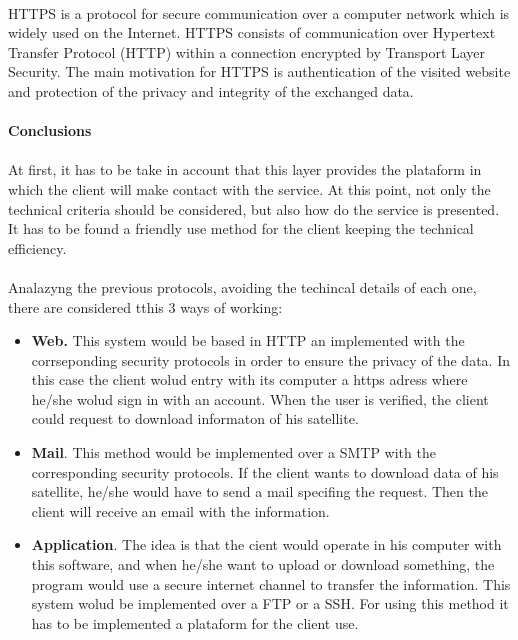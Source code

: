 \paragraph{}
HTTPS is a protocol for secure communication over a computer network which is widely used on the Internet. HTTPS consists of communication over Hypertext Transfer Protocol (HTTP) within a connection encrypted by Transport Layer Security. The main motivation for HTTPS is authentication of the visited website and protection of the privacy and integrity of the exchanged data.


\paragraph{} \textbf{Conclusions}
\paragraph{}
At first, it has to be take in account that this layer provides the plataform in which the client will make contact with the service. At this point, not only the technical criteria should be considered, but also how do the service is presented. It has to be found a friendly use method for the client keeping the technical efficiency.
\paragraph{}
Analazyng the previous protocols, avoiding the techincal details of each one, there are considered tthis 3 ways of working:
\begin{itemize}
\item \textbf{Web.} This system would be based in HTTP an implemented with the corrseponding security protocols in order to ensure the privacy of the data. In this case the client wolud entry with its computer a https adress where he/she wolud sign in with an account. When the user is verified, the client could request to download informaton of his satellite. 
\item \textbf{Mail}. This method would be implemented over a SMTP with the corresponding security protocols. If the client wants to download data of his satellite, he/she would have to send a mail specifing the request. Then the client will receive an email with the information.
\item \textbf{Application}.  The idea is that the cient would operate in his computer with this software, and when he/she want to upload or download something, the program would use a secure internet channel to transfer the information. This system wolud be implemented over a FTP or a SSH. For using this method it has to be implemented a plataform for the client use.
\end{itemize}


